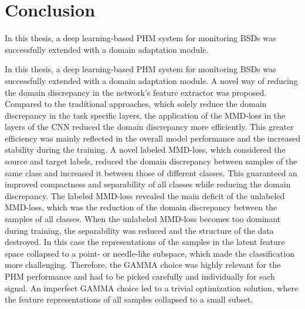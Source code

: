 \chapter{Conclusion}\label{chapter:conclusion}


In this thesis, a deep learning-based PHM system for monitoring BSDs was successfully extended with a domain adaptation module. 


In this thesis, a deep learning-based PHM system for monitoring BSDs was successfully extended with a domain adaptation module. A novel way of reducing the domain discrepancy in the network's feature extractor was proposed. Compared to the traditional approaches, which solely reduce the domain discrepancy in the task specific layers, the application of the MMD-loss in the layers of the CNN reduced the domain discrepancy more efficiently. This greater efficiency was mainly reflected in the overall model performance and the increased stability during the training. A novel labeled MMD-loss, which considered the source and target labels, reduced the domain discrepancy between samples of the same class and increased it between those of different classes. This guaranteed an improved compactness and separability of all classes while reducing the domain discrepancy. The labeled MMD-loss revealed the main deficit of the unlabeled MMD-loss, which was the reduction of the domain discrepancy between the samples of all classes. When the unlabeled MMD-loss becomes too dominant during training, the separability was reduced and the structure of the data destroyed. In this case the representations of the samples in the latent feature space collapsed to a point- or needle-like subspace, which made the classification more challenging. Therefore, the GAMMA choice was highly relevant for the PHM performance and had to be picked carefully and individually for each signal. An imperfect GAMMA choice led to a trivial optimization solution, where the feature representations of all samples collapsed to a small subset.


